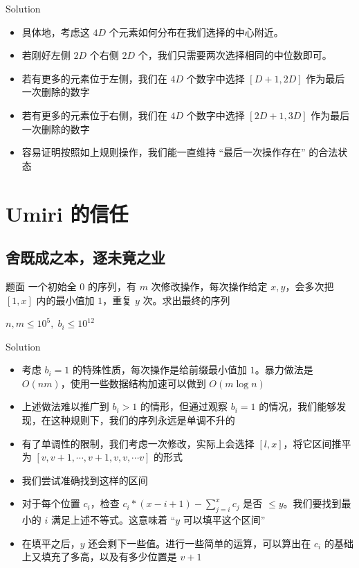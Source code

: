 ﻿\documentclass[aspectratio=169]{ctexbeamer}
\begin{document}
\begin{frame}{Solution}
    \begin{itemize}
        \item 具体地，考虑这 $4D$ 个元素如何分布在我们选择的中心附近。
        \item 若刚好左侧 $2D$ 个右侧 $2D$ 个，我们只需要两次选择相同的中位数即可。
        \item 若有更多的元素位于左侧，我们在 $4D$ 个数字中选择 $[D+1,2D]$ 作为最后一次删除的数字
        \item 若有更多的元素位于右侧，我们在 $4D$ 个数字中选择 $[2D+1,3D]$ 作为最后一次删除的数字
        \item 容易证明按照如上规则操作，我们能一直维持 “最后一次操作存在” 的合法状态
    \end{itemize}
\end{frame}


\section{Umiri 的信任}
\subsection{舍既成之本，逐未竟之业}
\begin{frame}{题面}
    一个初始全 $ 0 $ 的序列，有 $m$ 次修改操作，每次操作给定 $x,y$，会多次把 $[1,x]$ 内的最小值加 $ 1 $，重复 $y$ 次。求出最终的序列

    $n,m\le 10^5,\; b_i\le 10^{12}$
\end{frame}

\begin{frame}{Solution}
    \begin{itemize}
        \item 考虑 $b_i=1$ 的特殊性质，每次操作是给前缀最小值加 $1$。暴力做法是 $O(nm)$，使用一些数据结构加速可以做到 $O(m\log n)$
        \item 上述做法难以推广到 $b_i>1$ 的情形，但通过观察 $b_i=1$ 的情况，我们能够发现，在这种规则下，我们的序列永远是单调不升的
        \item 有了单调性的限制，我们考虑一次修改，实际上会选择 $[l,x]$，将它区间推平为 $[v,v+1,\cdots,v+1,v,v,\cdots v]$ 的形式
        \item 我们尝试准确找到这样的区间
        \item 对于每个位置 $c_i$，检查 $c_i*(x-i+1)-\sum_{j=i}^x c_j$ 是否 $\le y$。我们要找到最小的 $i$ 满足上述不等式。这意味着 “$y$ 可以填平这个区间”
        \item 在填平之后，$y$ 还会剩下一些值。进行一些简单的运算，可以算出在 $c_i$ 的基础上又填充了多高，以及有多少位置是 $v+1$
    \end{itemize}
\end{frame}
\end{document}
